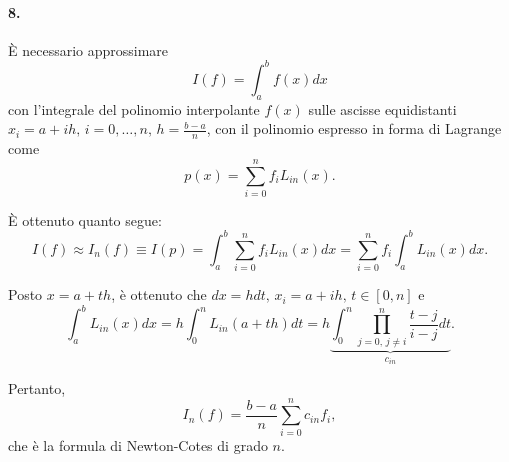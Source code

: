 \paragraph{8.} È necessario approssimare
\begin{equation*}
    I(f)=\int_a^bf(x)dx
\end{equation*}
con l'integrale del polinomio interpolante $f(x)$ sulle ascisse equidistanti $x_i=a+ih,\, i=0,\hdots,n,\, h=\frac{b-a}{n}$, con il polinomio espresso in forma di Lagrange come
\begin{equation*}
    p(x)=\sum_{i=0}^nf_i L_{in}(x).
\end{equation*}

È ottenuto quanto segue:
\begin{equation*}
    I(f)\approx I_n(f) \equiv I(p)=\int_a^b\sum_{i=0}^nf_iL_{in}(x)dx = \sum_{i=0}^nf_i\int_a^b L_{in}(x)dx.
\end{equation*}

Posto $x=a+th$, è ottenuto che $dx=hdt,\, x_i=a+ih,\, t\in[0,n]$ e
\begin{equation*}
    \int_a^bL_{in}(x)dx=h\int_0^nL_{in}(a+th)dt = h \underbrace{\int_0^n\prod_{j=0,\, j\neq i}^n\frac{t-j}{i-j}dt}_{c_{in}}.
\end{equation*}

Pertanto,
\begin{equation*}
    I_n(f)=\frac{b-a}{n}\sum_{i=0}^nc_{in}{f_i},
\end{equation*}
che è la formula di Newton-Cotes di grado $n$.